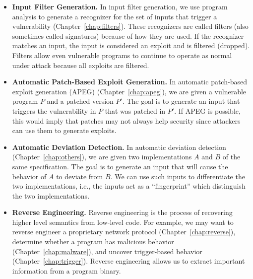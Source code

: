 \begin{itemize}\squish
\item {\bf Input Filter Generation.}  In input filter generation, we
  use program analysis to generate a recognizer for the set of inputs
  that trigger a vulnerability (Chapter~\ref{chap:filters}). These
  recognizers are called filters (also sometimes called signatures)
  because of how they are used. If the recognizer matches an input,
  the input is considered an exploit and is filtered (dropped).
  Filters allow even vulnerable programs to continue to operate as
  normal under attack because all exploits are filtered. 

\item {\bf Automatic Patch-Based Exploit Generation.}  In automatic
  patch-based exploit generation (APEG) (Chapter~\ref{chap:apeg}), we
  are given a vulnerable program $P$ and a patched version $P'$. The
  goal is to generate an input that triggers the vulnerability in $P$
  that was patched in $P'$.  If APEG is possible, this would imply
  that patches may not always help security since attackers can use
  them to generate exploits.  

\item {\bf Automatic Deviation Detection.}  In automatic deviation
  detection (Chapter~\ref{chap:others}), we are given two
  implementations $A$ and $B$ of the same specification. The goal is
  to generate an input that will cause the behavior of $A$ to deviate
  from $B$. We can use such inputs to differentiate the two
  implementations, i.e., the inputs act as a ``fingerprint'' which
  distinguish the two implementations.

\item {\bf Reverse Engineering.}  Reverse engineering is the process
  of recovering higher level semantics from low-level code.  For
  example, we may want to reverse engineer a proprietary network
  protocol (Chapter~\ref{chap:reverse}), determine whether a program
  has malicious behavior (Chapter~\ref{chap:malware}), and uncover
  trigger-based behavior (Chapter~\ref{chap:trigger}). Reverse
  engineering allows us to extract important information from a
  program binary. 


\end{itemize}

